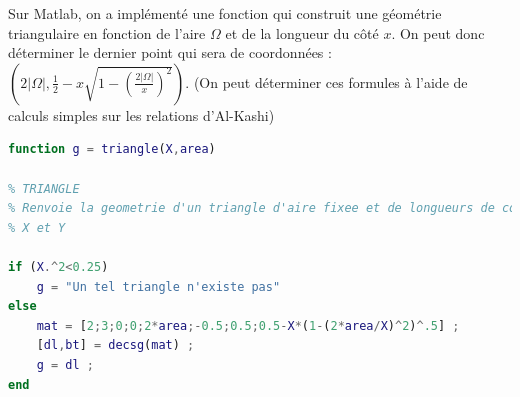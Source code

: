 \documentclass[a4paper,reqno]{article}
\begin{document}
\newpage 

Sur Matlab, on a implémenté une fonction qui construit une géométrie triangulaire en fonction de l'aire $\Omega$ et de la longueur du côté $x$. On peut donc déterminer le dernier point qui sera de coordonnées : $(2|\Omega|,\frac{1}{2} - x\sqrt{1-(\frac{2|\Omega|}{x})^2})$. (On peut déterminer ces formules à l'aide de calculs simples sur les relations d'Al-Kashi)

\begin{lstlisting}[language=Matlab,frame=single,caption=Construction d'une géométrie Triangulaire]
function g = triangle(X,area)

% TRIANGLE
% Renvoie la geometrie d'un triangle d'aire fixee et de longueurs de cote 
% X et Y 

if (X.^2<0.25)
    g = "Un tel triangle n'existe pas" 
else 
    mat = [2;3;0;0;2*area;-0.5;0.5;0.5-X*(1-(2*area/X)^2)^.5] ; 
    [dl,bt] = decsg(mat) ;
    g = dl ;
end
\end{lstlisting}

\end{document}
